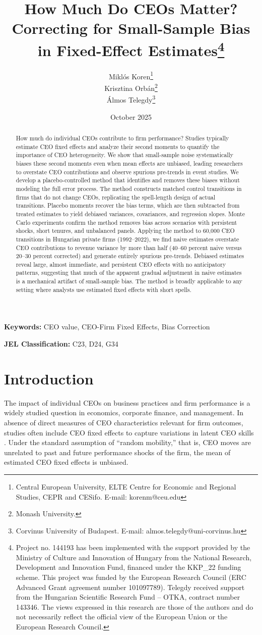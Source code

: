\documentclass[11pt,a4paper]{article}
\title{How Much Do CEOs Matter? Correcting for Small-Sample Bias in Fixed-Effect Estimates\thanks{Project no. 144193 has been implemented with the support provided by the Ministry of Culture and Innovation of Hungary from the National Research, Development and Innovation Fund, financed under the KKP\_22 funding scheme. This project was funded by the European Research Council (ERC Advanced Grant agreement number 101097789). Telegdy received support from the Hungarian Scientific Research Fund – OTKA, contract number 143346. The views expressed in this research are those of the authors and do not necessarily reflect the official view of the European Union or the European Research Council.}}
\author{Miklós Koren\thanks{Central European University, ELTE Centre for Economic and Regional Studies, CEPR and CESifo. E-mail: korenm@ceu.edu} \\
        Krisztina Orbán\thanks{Monash University.} \\
        Álmos Telegdy\thanks{Corvinus University of Budapest. E-mail: almos.telegdy@uni-corvinus.hu}}
\date{October 2025}
\begin{document}
\maketitle
\thispagestyle{empty}

\begin{abstract}
How much do individual CEOs contribute to firm performance? Studies typically estimate CEO fixed effects and analyze their second moments to quantify the importance of CEO heterogeneity. We show that small-sample noise systematically biases these second moments even when mean effects are unbiased, leading researchers to overstate CEO contributions and observe spurious pre-trends in event studies. We develop a placebo-controlled method that identifies and removes these biases without modeling the full error process. The method constructs matched control transitions in firms that do not change CEOs, replicating the spell-length design of actual transitions. Placebo moments recover the bias terms, which are then subtracted from treated estimates to yield debiased variances, covariances, and regression slopes. Monte Carlo experiments confirm the method removes bias across scenarios with persistent shocks, short tenures, and unbalanced panels. Applying the method to 60,000 CEO transitions in Hungarian private firms (1992--2022), we find naive estimates overstate CEO contributions to revenue variance by more than half (40--60 percent naive versus 20--30 percent corrected) and generate entirely spurious pre-trends. Debiased estimates reveal large, almost immediate, and persistent CEO effects with no anticipatory patterns, suggesting that much of the apparent gradual adjustment in naive estimates is a mechanical artifact of small-sample bias. The method is broadly applicable to any setting where analysts use estimated fixed effects with short spells.
\end{abstract}

\textbf{Keywords:} CEO value, CEO-Firm Fixed Effects, Bias Correction

\textbf{JEL Classification:} C23, D24, G34

\clearpage
\setcounter{page}{1}

\section{Introduction}

The impact of individual CEOs on business practices and firm performance is a widely studied question in economics, corporate finance, and management. In absence of direct measures of CEO characteristics relevant for firm outcomes, studies often include CEO fixed effects to capture variations in latent CEO skills \citep{Bertrand2003-io, crossland2011differences, quigley2015has}. Under the standard assumption of ``random mobility,'' that is, CEO moves are unrelated to past and future performance shocks of the firm, the mean of estimated CEO fixed effects is unbiased. 
\end{document}
